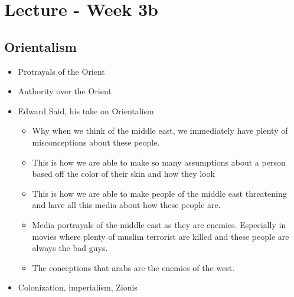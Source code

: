 \documentclass{article}
\begin{document}
\pagebreak

\section{Lecture - Week 3b}

\subsection{Orientalism}
\begin{itemize}
  \item Protrayals of the Orient
  \item Authority over the Orient
  \item Edward Said, his take on Orientalism

    \begin{itemize}
  \item Why when we think of the middle east, we immediately have
    plenty of misconceptions about these people.

  \item This is how we are able to make so many assumptions about a person
    based off the color of their skin and how they look
  \item This is how we are able to make people of the 
    middle east threatening and have
    all this media about how these people are.
  \item Media portrayals of the middle east as
    they are enemies.
    Especially in movies where plenty of muslim terrorist
    are killed and these people are always the bad guys.
  \item The conceptions that arabs are the enemies of the west.
    \end{itemize}

  \item Colonization, imperialism, Zionis
\end{itemize}
\end{document}
